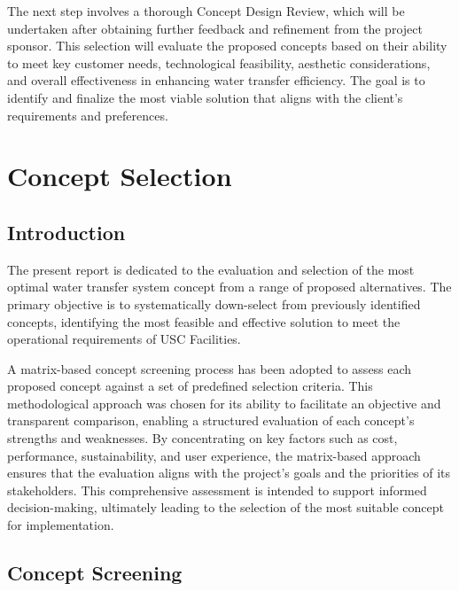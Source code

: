 \documentclass[12pt]{report}
\begin{document}
The next step involves a thorough Concept Design Review, which will be undertaken after obtaining further feedback and refinement from the project sponsor. This selection will evaluate the proposed concepts based on their ability to meet key customer needs, technological feasibility, aesthetic considerations, and overall effectiveness in enhancing water transfer efficiency. The goal is to identify and finalize the most viable solution that aligns with the client's requirements and preferences.

\chapter{Concept Selection}
\section{Introduction}
\label{sec:introduction}

The present report is dedicated to the evaluation and selection of the most optimal water transfer system concept from a range of proposed alternatives. The primary objective is to systematically down-select from previously identified concepts, identifying the most feasible and effective solution to meet the operational requirements of USC Facilities.

A matrix-based concept screening process has been adopted to assess each proposed concept against a set of predefined selection criteria. This methodological approach was chosen for its ability to facilitate an objective and transparent comparison, enabling a structured evaluation of each concept's strengths and weaknesses. By concentrating on key factors such as cost, performance, sustainability, and user experience, the matrix-based approach ensures that the evaluation aligns with the project's goals and the priorities of its stakeholders. This comprehensive assessment is intended to support informed decision-making, ultimately leading to the selection of the most suitable concept for implementation.


\section{Concept Screening}
\label{sec:concept_screening}
\end{document}
